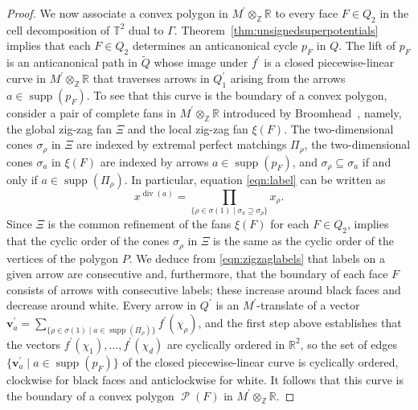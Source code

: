 \documentclass[11pt,a4paper]{amsart}
\numberwithin{equation}{section}
\theoremstyle{definition}
\theoremstyle{remark}
\newcommand{\RR}{\ensuremath{\mathbb{R}}}
\newcommand{\ZZ}{\ensuremath{\mathbb{Z}}}
\renewcommand{\div}{\operatorname{div}}
\newcommand{\supp}{\operatorname{supp}}
\newcommand{\Tile}{\operatorname{\mathcal{P}}}
\begin{document}
\begin{proof}
We now associate a convex polygon in $M^\prime\otimes_\ZZ \RR$ to every face $F\in Q_2$ in the cell decomposition of $\mathbb{T}^2$ dual to $\Gamma$. Theorem~\ref{thm:unsignedsuperpotentials} implies that each $F\in Q_2$ determines an anticanonical cycle $p_F$ in $Q$. The lift of $p_F$ is an anticanonical path in $\widetilde{Q}$ whose image under $f^\prime$ is a closed piecewise-linear curve in $M^\prime\otimes_\ZZ \RR$ that traverses arrows in $Q^\prime_1$ arising from the arrows $a\in \supp(p_F)$. To see that this curve is the boundary of a convex polygon, consider a pair of complete fans in $M^\prime\otimes_\ZZ \RR$ introduced by Broomhead~\cite[\S4.4-4.5]{Broomhead},  namely, the global zig-zag fan $\Xi$ and the local zig-zag fan $\xi(F)$. The two-dimensional cones $\sigma_\rho$ in $\Xi$ are indexed by extremal perfect matchings $\Pi_\rho$,  the two-dimensional cones $\sigma_a$ in $\xi(F)$ are indexed by arrows $a\in \supp(p_F)$, and $\sigma_\rho\subseteq \sigma_a$ if and only if $a\in \supp(\Pi_\rho)$. In particular, equation \eqref{eqn:label} can be written as
\begin{equation}
\label{eqn:zigzaglabels}
x^{\div(a)} = \prod_{\{\rho\in \sigma(1) \mid \sigma_a\supseteq \sigma_\rho\}} x_\rho.
\end{equation}
Since $\Xi$ is the common refinement of the fans $\xi(F)$ for each $F\in Q_2$, \cite[Remark 4.16]{Broomhead} implies that the cyclic order of the cones $\sigma_\rho$ in $\Xi$ is the same as the cyclic order of the vertices of the polygon $P$. We deduce from \eqref{eqn:zigzaglabels} that labels on a given arrow are consecutive and, furthermore, that the boundary of each face $F$ consists of arrows with consecutive labels; these increase around black faces and decrease around white.  Every arrow in $Q^\prime$ is an $M^\prime$-translate of a vector $\mathbf{v}_a^\prime = \sum_{\{\rho\in \sigma(1) \mid a\in \supp(\Pi_\rho)\}} f^\prime(\chi_\rho)$, and the first step above establishes that the vectors $f^\prime(\chi_1), \dots, f^\prime(\chi_d)$ are cyclically ordered in $\RR^2$, so the set of edges $\{\mathbf{v}^\prime_a \mid a\in\supp(p_F)\}$ of the closed piecewise-linear curve is cyclically ordered,  clockwise for black faces and anticlockwise for white. It follows that this curve is the boundary of a convex polygon $\Tile(F)$ in $M^\prime\otimes_\ZZ \RR$.


\end{proof}
\end{document}
